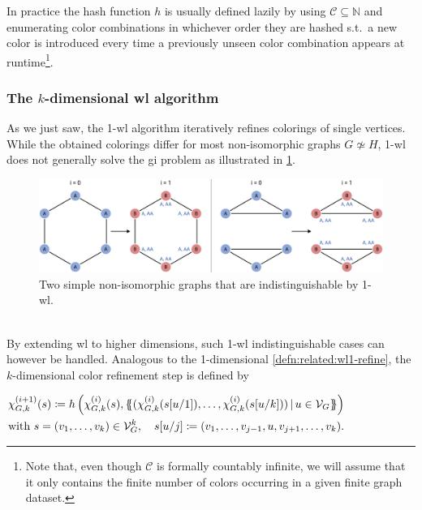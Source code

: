 In practice the hash function $h$ is usually defined lazily by using $\mathcal{C} \subseteq \mathbb{N}$ and enumerating color combinations in whichever order they are hashed s.t.\ a new color is introduced every time a previously unseen color combination appears at runtime\footnote{
	Note that, even though $\mathcal{C}$ is formally countably infinite, we will assume that it only contains the finite number of colors occurring in a given finite graph dataset.
}.

\subsubsection{The $k$-dimensional \acs{wl} algorithm}
As we just saw, the 1-\acs{wl} algorithm iteratively refines colorings of single vertices.
While the obtained colorings differ for most non-isomorphic graphs $G \not\simeq H$, 1-\acs{wl} does not generally solve the \ac{gi} problem as illustrated in \cref{fig:related:wl1-problem}.
\begin{figure}[ht]
	\centering
	\includegraphics[width=\linewidth]{gfx/related-work/wl1-problem.pdf}
	\caption[Two simple non-isomorphic graphs that are indistinguishable by 1-\acs{wl}.]{
		Two simple non-isomorphic graphs that are indistinguishable by 1-\acs{wl}.
	}\label{fig:related:wl1-problem}
\end{figure}\\
By extending \ac{wl} to higher dimensions, such 1-\acs{wl} indistinguishable cases can however be handled.
Analogous to the 1-dimensional \cref{defn:related:wl1-refine}, the $k$-dimensional color refinement step is defined by
\begin{defn}\label{defn:related:wlk-refine}
	$\begin{aligned}[t]
		\chi_{G,k}^{(i+1)}(s) \coloneqq h\left(\chi_{G,k}^{(i)}(s), \ldblbrace (\chi_{G,k}^{(i)}(s[u/1]), \dots, \chi_{G,k}^{(i)}(s[u/k]))\, |\, u \in \mathcal{V}_G \rdblbrace\right)\\
		\text{with } s = (v_1, \dots, v_k) \in \mathcal{V}_G^k,\quad s[u/j] \coloneqq (v_1, \dots, v_{j-1}, u, v_{j+1}, \dots, v_k) \text{.}
	\end{aligned}$
\end{defn}
